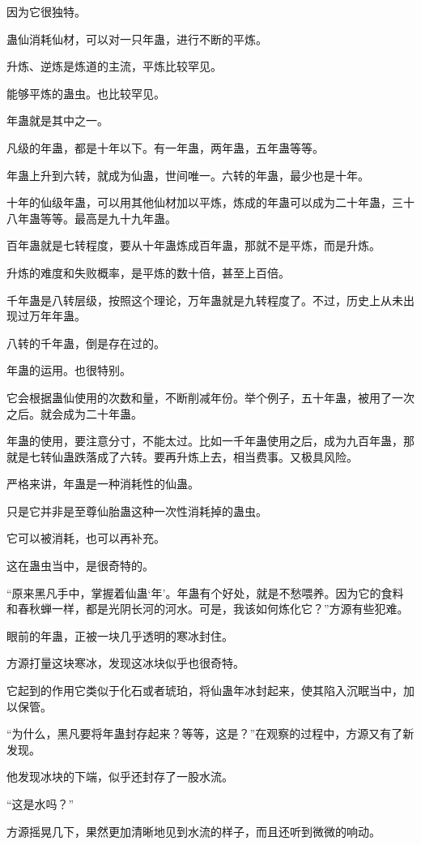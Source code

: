 \begin{this_body}
因为它很独特。

蛊仙消耗仙材，可以对一只年蛊，进行不断的平炼。

升炼、逆炼是炼道的主流，平炼比较罕见。

能够平炼的蛊虫。也比较罕见。

年蛊就是其中之一。

凡级的年蛊，都是十年以下。有一年蛊，两年蛊，五年蛊等等。

年蛊上升到六转，就成为仙蛊，世间唯一。六转的年蛊，最少也是十年。

十年的仙级年蛊，可以用其他仙材加以平炼，炼成的年蛊可以成为二十年蛊，三十八年蛊等等。最高是九十九年蛊。

百年蛊就是七转程度，要从十年蛊炼成百年蛊，那就不是平炼，而是升炼。

升炼的难度和失败概率，是平炼的数十倍，甚至上百倍。

千年蛊是八转层级，按照这个理论，万年蛊就是九转程度了。不过，历史上从未出现过万年年蛊。

八转的千年蛊，倒是存在过的。

年蛊的运用。也很特别。

它会根据蛊仙使用的次数和量，不断削减年份。举个例子，五十年蛊，被用了一次之后。就会成为二十年蛊。

年蛊的使用，要注意分寸，不能太过。比如一千年蛊使用之后，成为九百年蛊，那就是七转仙蛊跌落成了六转。要再升炼上去，相当费事。又极具风险。

严格来讲，年蛊是一种消耗性的仙蛊。

只是它并非是至尊仙胎蛊这种一次性消耗掉的蛊虫。

它可以被消耗，也可以再补充。

这在蛊虫当中，是很奇特的。

“原来黑凡手中，掌握着仙蛊‘年’。年蛊有个好处，就是不愁喂养。因为它的食料和春秋蝉一样，都是光阴长河的河水。可是，我该如何炼化它？”方源有些犯难。

眼前的年蛊，正被一块几乎透明的寒冰封住。

方源打量这块寒冰，发现这冰块似乎也很奇特。

它起到的作用它类似于化石或者琥珀，将仙蛊年冰封起来，使其陷入沉眠当中，加以保管。

“为什么，黑凡要将年蛊封存起来？等等，这是？”在观察的过程中，方源又有了新发现。

他发现冰块的下端，似乎还封存了一股水流。

“这是水吗？”

方源摇晃几下，果然更加清晰地见到水流的样子，而且还听到微微的响动。


\end{this_body}
